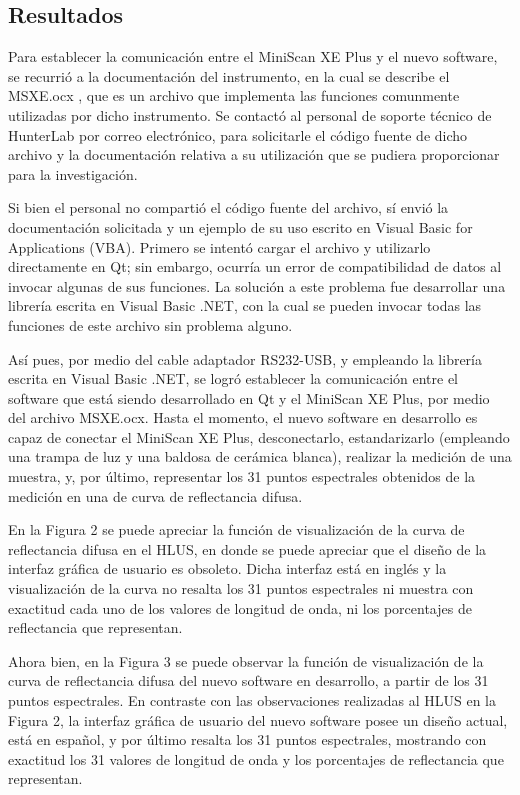 \documentclass[conference]{IEEEtran}
\begin{document}
	\subsection{Resultados}
	
	Para establecer la comunicaci\'{o}n entre el MiniScan XE Plus y el nuevo software, se recurri\'{o} a la documentaci\'{o}n del instrumento, en la cual se describe el MSXE.ocx \cite{MiniScanXEPlus-manual}, que es un archivo que implementa las funciones comunmente utilizadas por dicho instrumento. Se contact\'{o} al personal de soporte t\'{e}cnico de HunterLab por correo electr\'{o}nico, para solicitarle el c\'{o}digo fuente de dicho archivo y la documentaci\'{o}n relativa a su utilizaci\'{o}n que se pudiera proporcionar para la investigaci\'{o}n.
	
	Si bien el personal no comparti\'{o} el c\'{o}digo fuente del archivo, s\'{i} envi\'{o} la documentaci\'{o}n solicitada y un ejemplo de su uso escrito en Visual Basic for Applications (VBA). Primero se intent\'{o} cargar el archivo y utilizarlo directamente en Qt; sin embargo, ocurr\'{i}a un error de compatibilidad de datos al invocar algunas de sus funciones. La soluci\'{o}n a este problema fue desarrollar una librer\'{i}a escrita en Visual Basic .NET, con la cual se pueden invocar todas las funciones de este archivo sin problema alguno.

	As\'{i} pues, por medio del cable adaptador RS232-USB, y empleando la librer\'{i}a escrita en Visual Basic .NET, se logr\'{o} establecer la comunicaci\'{o}n entre el software que est\'{a} siendo desarrollado en Qt y el MiniScan XE Plus, por medio del archivo MSXE.ocx. Hasta el momento, el nuevo software en desarrollo es capaz de conectar el MiniScan XE Plus, desconectarlo, estandarizarlo (empleando una trampa de luz y una baldosa de cer\'{a}mica blanca), realizar la medici\'{o}n de una muestra, y, por \'{u}ltimo, representar los 31 puntos espectrales obtenidos de la medici\'{o}n en una de curva de reflectancia difusa.
	
	En la Figura 2 se puede apreciar la funci\'{o}n de visualizaci\'{o}n de la curva de reflectancia difusa en el HLUS, en donde se puede apreciar que el dise\~{n}o de la interfaz gr\'{a}fica de usuario es obsoleto. Dicha interfaz est\'{a} en ingl\'{e}s y la visualizaci\'{o}n de la curva no resalta los 31 puntos espectrales ni muestra con exactitud cada uno de los valores de longitud de onda, ni los porcentajes de reflectancia que representan.
	
	Ahora bien, en la Figura 3 se puede observar la funci\'{o}n de visualizaci\'{o}n de la curva de reflectancia difusa del nuevo software en desarrollo, a partir de los 31 puntos espectrales. En contraste con las observaciones realizadas al HLUS en la Figura 2, la interfaz gr\'{a}fica de usuario del nuevo software posee un dise\~{n}o actual, est\'{a} en espa\~{n}ol, y por \'{u}ltimo resalta los 31 puntos espectrales, mostrando con exactitud los 31 valores de longitud de onda y los porcentajes de reflectancia que representan.
	
\end{document}
